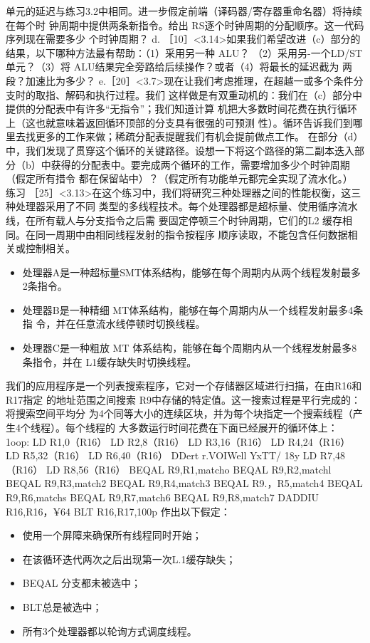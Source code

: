 单元的延迟与练习3.2中相同。进一步假定前端（译码器/寄存器重命名器）将持续在每个时
钟周期中提供两条新指令。给出 RS逐个时钟周期的分配顺序。这一代码序列现在需要多少
个时钟周期？
d. ［10］<3.14>如果我们希望改进（c）部分的结果，以下哪种方法最有帮助：（1）采用另一种 ALU？
（2）采用另-一个LD/ST单元？（3）将 ALU结果完全旁路给后续操作？或者（4）将最长的延迟截为
两段？加速比为多少？
e.［20］<3.7>现在让我们考虑推理，在超越一或多个条件分支时的取指、解码和执行过程。我们
这样做是有双重动机的：我们在（c）部分中提供的分配表中有许多“无指令”；我们知道计算
机把大多数时间花费在执行循环上（这也就意味着返回循环顶部的分支具有很强的可预测
性）。循环告诉我们到哪里去找更多的工作来做；稀疏分配表提醒我们有机会提前做点工作。
在部分（d）中，我们发现了贯穿这个循环的关键路径。设想一下将这个路径的第二副本迭入部
分（b）中获得的分配表中。要完成两个循环的工作，需要增加多少个时钟周期（假定所有措令
都在保留站中）？（假定所有功能单元都完全实现了流水化。）
练习
［25］<3.13>在这个练习中，我们将研究三种处理器之间的性能权衡，这三种处理器采用了不同
类型的多线程技术。每个处理器都是超标量、使用循序流水线，在所有载人与分支指令之后需
要固定停顿三个时钟周期，它们的L2 缓存相同。在同一周期中由相同线程发射的指令按程序
顺序读取，不能包含任何数据相关或控制相关。
\begin{itemize}
    \item 处理器A是一种超标量SMT体系结构，能够在每个周期内从两个线程发射最多2条指令。
    \item 处理器B是一种精细 MT体系结构，能够在每个周期内从一个线程发射最多4条指
    令，并在任意流水线停顿时切换线程。
    \item 处理器C是一种粗放 MT 体系结构，能够在每个周期内从一个线程发射最多8条指令，并在
    L1缓存缺失时切换线程。
\end{itemize}
我们的应用程序是一个列表搜索程序，它对一个存储器区域进行扫描，在由R16和R17指定
的地址范围之间搜索 R9中存储的特定值。这一搜索过程是平行完成的：将搜索空间平均分
为4个同等大小的连续区块，并为每个块指定一个搜索线程（产生4个线程）。每个线程的
大多数运行时间花费在下面已经展开的循环体上：
1oop: LD R1,0（R16）
LD R2,8（R16）
LD R3,16（R16）
LD R4,24（R16）
LD R5,32（R16）
LD R6,40（R16）
DDert r.VOIWell YxTT/
18y
LD R7,48（R16）
LD R8,56（R16）
BEQAL R9,R1,matcho
BEQAL R9,R2,matchl
BEQAL R9,R3,match2
BEQAL R9,R4,match3
BEQAL R9.，R5,match4
BEQAL R9,R6,matchs
BEQAL R9,R7,match6
BEQAL R9,R8,match7
DADDIU R16,R16，¥64
BLT R16,R17,100p
作出以下假定：
\begin{itemize}
    \item 使用一个屏障来确保所有线程同时开始；
    \item 在该循环迭代两次之后出现第一次L.1缓存缺失；
    \item BEQAL 分支都未被选中；
    \item BLT总是被选中；
    \item 所有3个处理器都以轮询方式调度线程。
\end{itemize}
